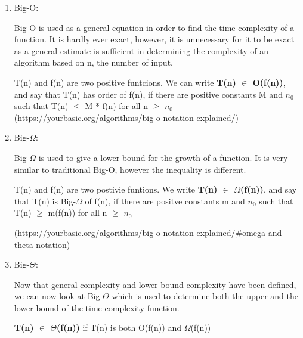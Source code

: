\documentclass{article}
\begin{document}
\begin{enumerate}
    \item Big-O: \\
    
            \smallskip

            Big-O is used as a general equation in order to find the time complexity of a function.
            It is hardly ever exact, however, it is unnecessary for it to be exact as a general
            estimate is sufficient in determining the complexity of an algorithm based on n, the
            number of input.

            T(n) and f(n) are two positive funtcions. We can write \textbf{T(n) $\in$ O(f(n))},
            and say that T(n) has order of f(n), if there are positive constants M and $n_0$ 
            such that T(n) $\leq$ M * f(n) for all n $\geq$ $n_0$ \\

            (\url{https://yourbasic.org/algorithms/big-o-notation-explained/})
            
            \smallskip

    \item Big-$\Omega$: \\
    
            \smallskip

            Big $\Omega$ is used to give a lower bound for the growth of a function.
            It is very similar to traditional Big-O, however the inequality is different.

            T(n) and f(n) are two postivie funtions. We write \textbf{T(n) $\in$ $\Omega$(f(n))},
            and say that T(n) is Big-$\Omega$ of f(n), if there are positve constants m and $n_0$
            such that T(n) $\geq$ m(f(n)) for all n $\geq$ $n_0$

            (\url{https://yourbasic.org/algorithms/big-o-notation-explained/#omega-and-theta-notation})

            \smallskip

    \item Big-$\Theta$: \\
    
            \smallskip

            Now that general complexity and lower bound complexity have been defined, we can now look
            at Big-$\Theta$ which is used to determine both the upper and the lower bound of the 
            time complexity function.

            \textbf{T(n) $\in$ $\Theta$(f(n))} if T(n) is both O(f(n)) and $\Omega$(f(n))

            \smallskip

\end{enumerate}
\end{document}
